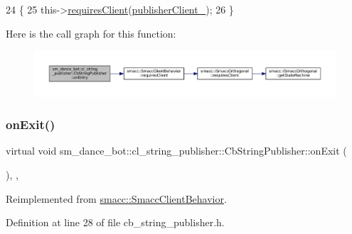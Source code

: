 \begin{DoxyCode}
24     \{
25         this->\hyperlink{classsmacc_1_1SmaccClientBehavior_a917f001e763a1059af337bf4e164f542}{requiresClient}(\hyperlink{classsm__dance__bot_1_1cl__string__publisher_1_1CbStringPublisher_aafcad6e6296a3088cb91ffeb22025bd6}{publisherClient\_});
26     \}
\end{DoxyCode}
Here is the call graph for this function\+:
\nopagebreak
\begin{figure}[H]
\begin{center}
\leavevmode
\includegraphics[width=350pt]{classsm__dance__bot_1_1cl__string__publisher_1_1CbStringPublisher_a7aa533578e820ee90d92d15b85d42e9b_cgraph}
\end{center}
\end{figure}
\mbox{\label{classsm__dance__bot_1_1cl__string__publisher_1_1CbStringPublisher_ac93cc1eb150140331cb3e560ec8249e2}} 
\subsubsection{\texorpdfstring{on\+Exit()}{onExit()}}
{\footnotesize\ttfamily virtual void sm\+\_\+dance\+\_\+bot\+::cl\+\_\+string\+\_\+publisher\+::\+Cb\+String\+Publisher\+::on\+Exit (\begin{DoxyParamCaption}{ }\end{DoxyParamCaption})\hspace{0.3cm}{\ttfamily [inline]}, {\ttfamily [override]}, {\ttfamily [virtual]}}



Reimplemented from \hyperlink{classsmacc_1_1SmaccClientBehavior_ac0cd72d42bd00425362a97c9803ecce5}{smacc\+::\+Smacc\+Client\+Behavior}.



Definition at line 28 of file cb\+\_\+string\+\_\+publisher.\+h.



